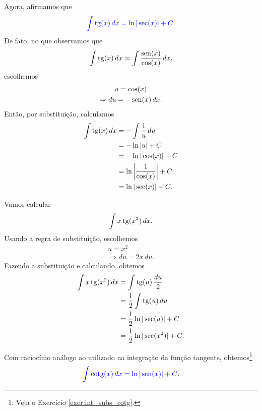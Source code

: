 Agora, afirmamos que 
\begin{equation}
  {\color{blue}\int \operatorname{tg}(x)\,dx = \ln|\sec(x)| + C}.
\end{equation}
De fato, no que observamos que
\begin{equation}
  \int \operatorname{tg}(x)\,dx = \int \frac{\operatorname{sen}(x)}{\cos(x)}\,dx,
\end{equation}
escolhemos
\begin{gather}
  u = \cos(x)\\
  \Rightarrow du = -\operatorname{sen}(x)\,dx.
\end{gather}
Então, por substituição, calculamos
\begin{align}
  \int \operatorname{tg}(x)\,dx &= -\int \frac{1}{u}\,du \\
                  &= -\ln|u| + C \\
                  &= -\ln|\cos(x)| + C \\
                  &= \ln\left|\frac{1}{\cos(x)}\right| + C\\
                  &= \ln|\sec(x)| + C.
\end{align}

\begin{ex}
  Vamos calcular
  \begin{equation}
    \int x\operatorname{tg}(x^2)\,dx.
  \end{equation}
  Usando a regra de substituição, escolhemos
  \begin{gather}
    u = x^2 \\
    \Rightarrow du = 2x\,du.
  \end{gather}
  Fazendo a substituição e calculando, obtemos
  \begin{align}
    \int x\operatorname{tg}(x^2)\,dx &= \int \operatorname{tg}(u)\,\frac{du}{2} \\
                       &= \frac{1}{2}\int \operatorname{tg}(u)\,du \\
                       &= \frac{1}{2}\ln|\sec(u)| + C \\
                       &= \frac{1}{2}\ln|\sec(x^2)| + C.
  \end{align}
\end{ex}

Com raciocínio análogo ao utilizado na integração da função tangente, obtemos\footnote{Veja o Exercício \ref{exer:int_subs_cotg}.}
\begin{equation}
  {\color{blue}\int \operatorname{cotg}(x)\,dx = \ln|\operatorname{sen}(x)| + C}.
\end{equation}


